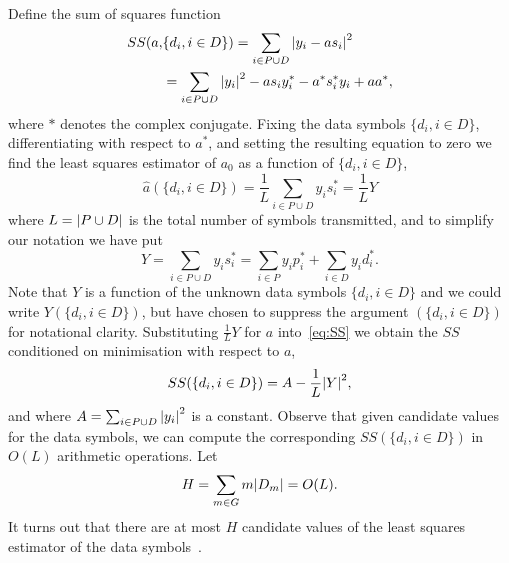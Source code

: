 \documentclass[journal]{IEEEtran}
\begin{document}
Define the sum of squares function
\begin{align}
SS(a, &\{d_i, i \in D\}) = \sum_{i \in P \cup D} {\left\vert  y_i - a s_i  \right\vert}^2 \nonumber \\
&= \sum_{i \in P \cup D} {\left\vert y_i \right\vert}^2 - a s_i y_i^* - a^* s_i^* y_i + aa^*, \label{eq:SS}
\end{align}
where $*$ denotes the complex conjugate.  Fixing the data symbols $\{d_i, i \in D\}$, differentiating with respect to $a^*$, and setting the resulting equation to zero we find the least squares estimator of $a_0$ as a function of $\{d_i, i \in D\}$,
\begin{equation}\label{eq:hata}
\hat{a}(\{d_i, i \in D\}) = \frac{1}{L} \sum_{i \in P \cup D} y_i s_i^* = \frac{1}{L} Y
\end{equation}
where $L = {\left\vert P \cup D \right\vert}$ is the total number of symbols transmitted, and to simplify our notation we have put 
\[
Y = \sum_{i \in P \cup D} y_i s_i^* = \sum_{i \in P } y_i p_i^* + \sum_{i \in D } y_i d_i^*.
\]  
Note that $Y$ is a function of the unknown data symbols $\{ d_i, i \in D\}$ and we could write $Y(\{ d_i, i \in D\})$, but have chosen to suppress the argument $(\{ d_i, i \in D\})$ for notational clarity.  Substituting $\frac{1}{L}Y$ for $a$ into~\eqref{eq:SS} we obtain the $SS$ conditioned on minimisation with respect to $a$,
\begin{equation}\label{eq:SSdatasymbols}
SS(\{d_i, i \in D\}) = A - \frac{1}{L}{\left\vert Y \right\vert}^2,
\end{equation}
and where $A = \sum_{i \in P \cup D}{\left\vert y_i \right\vert}^2$ is a constant.  Observe that given candidate values for the data symbols, we can compute the corresponding $SS(\{d_i, i \in D\})$ in $O(L)$ arithmetic operations.  Let 
\[
H = \sum_{m\in G}m{\left\vert D_m \right\vert} = O(L).
\]
It turns out that there are at most $H$ candidate values of the least squares estimator of the data symbols~\cite{Sweldens2001,Mackenthun1994}.  %
\end{document}

